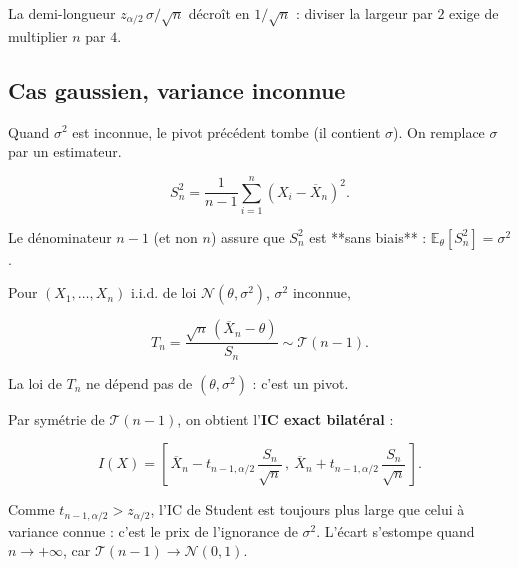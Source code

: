 \begin{remarque}
La demi-longueur $z_{\alpha/2}\,\sigma/\sqrt n$ décroît en $1/\sqrt n$ : diviser la largeur par $2$ exige de multiplier $n$ par $4$.
\end{remarque}

\subsection{Cas gaussien, variance inconnue}

Quand $\sigma^2$ est inconnue, le pivot précédent tombe (il contient $\sigma$). On remplace $\sigma$ par un estimateur.

\medskip

\begin{mdframed}
\begin{definition}
$$
S_n^2 = \frac{1}{n-1}\sum_{i=1}^n (X_i - \overline X_n)^2.
$$

Le dénominateur $n-1$ (et non $n$) assure que $S_n^2$ est **sans biais** : $\mathbb E_\theta[S_n^2] = \sigma^2$.
\end{definition}
\end{mdframed}

\medskip

\begin{mdframed}
\begin{proposition}
Pour $(X_1,\dots,X_n)$ i.i.d. de loi $\mathcal N(\theta,\sigma^2)$, $\sigma^2$ inconnue,

$$
T_n = \frac{\sqrt n\,(\overline X_n - \theta)}{S_n} \sim \mathcal T(n-1).
$$

La loi de $T_n$ ne dépend pas de $(\theta,\sigma^2)$ : c'est un pivot.
\end{proposition}
\end{mdframed}

\begin{exemple}[IC de Student]
Par symétrie de $\mathcal T(n-1)$, on obtient l'\textbf{IC exact bilatéral} :

$$
\boxed{\ I(X) = \left[\,\overline X_n - t_{n-1,\alpha/2}\,\frac{S_n}{\sqrt n}\,,\ \overline X_n + t_{n-1,\alpha/2}\,\frac{S_n}{\sqrt n}\,\right].\ }
$$
\end{exemple}

\begin{remarque}
Comme $t_{n-1,\alpha/2} > z_{\alpha/2}$, l'IC de Student est toujours plus large que celui à variance connue : c'est le prix de l'ignorance de $\sigma^2$. L'écart s'estompe quand $n \to +\infty$, car $\mathcal T(n-1) \to \mathcal N(0,1)$.
\end{remarque}

